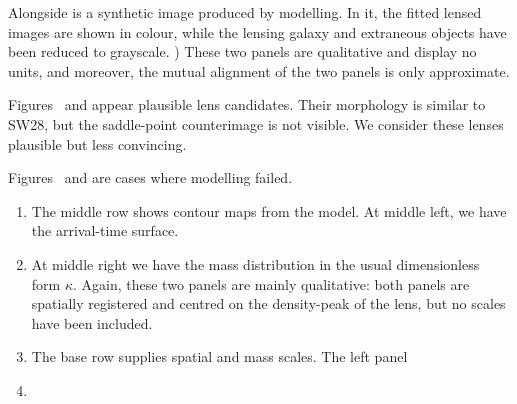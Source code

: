Alongside is a synthetic image produced by modelling.  In it, the
fitted lensed images are shown in colour, while the lensing galaxy and
extraneous objects have been reduced to grayscale.
) These two
panels are qualitative and display no units, and moreover, the mutual
alignment of the two panels is only approximate.

Figures~ and  appear plausible lens
candidates.  Their morphology is similar to SW28, but the saddle-point
counterimage is not visible.  We consider these lenses plausible but
less convincing.

Figures~ and  are cases where modelling
failed.

\begin{enumerate}
\item The middle row shows contour maps from the model.  At middle
  left, we have the arrival-time surface.
\item At middle right we have the mass distribution in the usual
  dimensionless form $\kappa$.  Again, these two panels are mainly
  qualitative: both panels are spatially registered and centred on the
  density-peak of the lens, but no scales have been included.
\item The base row supplies spatial and mass scales.  The left panel

\item 
\end{enumerate}

